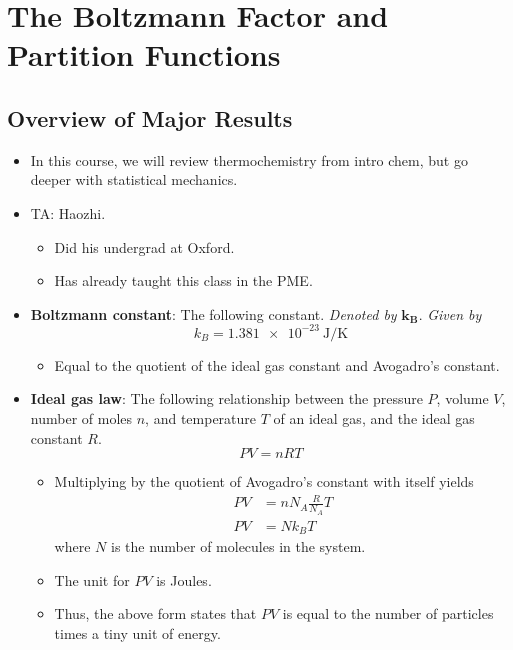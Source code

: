 \documentclass[../notes.tex]{subfiles}
\begin{document}
\chapter{The Boltzmann Factor and Partition Functions}
\section{Overview of Major Results}
\begin{itemize}
    \item {}In this course, we will review thermochemistry from intro chem, but go deeper with statistical mechanics.
    \item TA: Haozhi.
    \begin{itemize}
        \item Did his undergrad at Oxford.
        \item Has already taught this class in the PME.
    \end{itemize}
    \item \textbf{Boltzmann constant}: The following constant. \emph{Denoted by} $\bm{k_B}$. \emph{Given by}
    \begin{equation*}
        k_B = \SI[per-mode=symbol]{1.381e-23}{\joule\per\kelvin}
    \end{equation*}
    \begin{itemize}
        \item Equal to the quotient of the ideal gas constant and Avogadro's constant.
    \end{itemize}
    \item \textbf{Ideal gas law}: The following relationship between the pressure $P$, volume $V$, number of moles $n$, and temperature $T$ of an ideal gas, and the ideal gas constant $R$.
    \begin{equation*}
        PV = nRT
    \end{equation*}
    \begin{itemize}
        \item Multiplying by the quotient of Avogadro's constant with itself yields
        \begin{align*}
            PV &= nN_A\frac{R}{N_A}T\\
            PV &= Nk_BT
        \end{align*}
        where $N$ is the number of molecules in the system.
        \item The unit for $PV$ is Joules.
        \item Thus, the above form states that $PV$ is equal to the number of particles times a tiny unit of energy.

\end{itemize}
\end{itemize}
\end{document}

